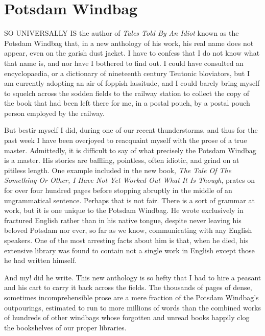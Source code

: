 \chapter{Potsdam Windbag}

SO UNIVERSALLY IS the author of \emph{Tales Told By An Idiot} known as the Potsdam Windbag that, in a new anthology of his work, his real name does not appear, even on the garish dust jacket. I have to confess that I do not know what that name is, and nor have I bothered to find out. I could have consulted an encyclopaedia, or a dictionary of nineteenth century Teutonic bloviators, but I am currently adopting an air of foppish lassitude, and I could barely bring myself to squelch across the sodden fields to the railway station to collect the copy of the book that had been left there for me, in a postal pouch, by a postal pouch person employed by the railway.

But bestir myself I did, during one of our recent thunderstorms, and thus for the past week I have been overjoyed to reacquaint myself with the prose of a true master. Admittedly, it is difficult to say of what precisely the Potsdam Windbag is a master. His stories are baffling, pointless, often idiotic, and grind on at pitiless length. One example included in the new book, \emph{The Tale Of The Something Or Other, I Have Not Yet Worked Out What It Is Though}, prates on for over four hundred pages before stopping abruptly in the middle of an ungrammatical sentence. Perhaps that is not fair. There is a sort of grammar at work, but it is one unique to the Potsdam Windbag. He wrote exclusively in fractured English rather than in his native tongue, despite never leaving his beloved Potsdam nor ever, so far as we know, communicating with any English speakers. One of the most arresting facts about him is that, when he died, his extensive library was found to contain not a single work in English except those he had written himself.

And my! did he write. This new anthology is so hefty that I had to hire a peasant and his cart to carry it back across the fields. The thousands of pages of dense, sometimes incomprehensible prose are a mere fraction of the Potsdam Windbag's outpourings, estimated to run to more millions of words than the combined works of hundreds of other windbags whose forgotten and unread books happily clog the bookshelves of our proper libraries.

